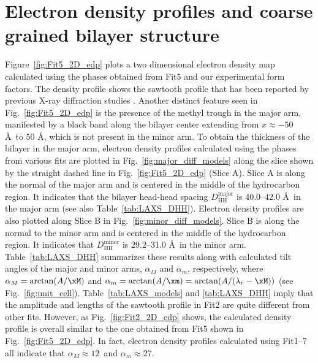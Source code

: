 \section{Electron density profiles and coarse grained bilayer structure}\label{sec:LAXS_edp}
Figure~\ref{fig:Fit5_2D_edp} plots a two dimensional electron density map calculated
using the phases obtained from Fit5 and our experimental form factors.
The density profile shows the sawtooth profile that has been reported by
previous X-ray diffraction studies \cite{ref:Sun96,ref:Sengupta03,ref:Pabst04}.
Another distinct feature seen in Fig.~\ref{fig:Fit5_2D_edp} is the 
presence of the methyl trough in the major arm, 
manifested by a black band along the bilayer center extending from 
$x \approx -50$ \AA\ to 50 \AA, which is not present in the minor arm.
To obtain the thickness of the bilayer in the major arm, 
electron density profiles calculated
using the phases from various fits are 
plotted in Fig.~\ref{fig:major_diff_models} 
along the slice shown by the straight dashed line in Fig.~\ref{fig:Fit5_2D_edp}
(Slice A).
Slice A is along the normal of the major arm and is centered in the middle of 
the hydrocarbon region. It indicates that the bilayer head-head spacing 
$D_\text{HH}^\text{major}$ is 40.0--42.0 \AA\ in the major arm
(see also Table~\ref{tab:LAXS_DHH}). 
Electron density profiles are also plotted along Slice B
in Fig.~\ref{fig:minor_diff_models}.
Slice B is
along the normal to the minor arm and is centered in the middle of the
hydrocarbon region. It indicates that $D_\text{HH}^\text{minor}$ is
29.2--31.0 \AA\ in the minor arm.
Table~\ref{tab:LAXS_DHH} summarizes these results along with calculated
tilt angles of the major and minor arms, $\alpha_M$ and $\alpha_m$, respectively,
where $\alpha_M=\arctan(A/\xM)$ and $\alpha_m=\arctan(A/\xm)=\arctan(A/(\lambda_r-\xM))$
(see Fig.~\ref{fig:unit_cell}). Table~\ref{tab:LAXS_models} and \ref{tab:LAXS_DHH}
imply that the amplitude and lengths of the sawtooth profile in Fit2 are 
quite different from other fits. However, as Fig.~\ref{fig:Fit2_2D_edp} shows,
the calculated density profile is overall similar to the one obtained from Fit5
shown in Fig.~\ref{fig:Fit5_2D_edp}. In fact, electron density profiles calculated
using Fit1--7 all indicate that $\alpha_M \approx 12$\textdegree\ and
$\alpha_m \approx 27$\textdegree. 

